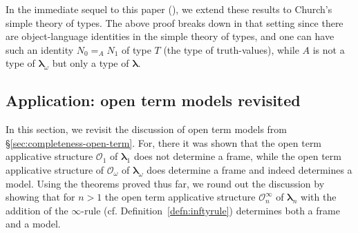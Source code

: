\documentclass{lmcs} %
\newcommand{\mlt}[1]{\boldsymbol\lambda_{#1}}
\newcommand{\mltpure}{\mlt{\omega}}
\newcommand{\lt}{\boldsymbol\lambda}
\begin{document}
In the immediate sequel to this paper (\cite{Walsh2024-mltII}), we extend these results to Church's simple theory of types. The above proof breaks down in that setting since there are object-language identities in the simple theory of types, and one can have such an identity $N_0=_A N_1$ of type $T$ (the type of truth-values), while $A$ is not a type of $\mltpure$ but only a type of $\lt$.




\subsection{Application: open term models revisited}\label{sec:opentermmodelsredeux}

In this section, we revisit the discussion of open term models from \S\ref{sec:completeness-open-term}. For, there it was shown that the open term applicative structure $\mathcal{O}_1$ of $\mlt{1}$ does not determine a frame, while the open term applicative structure of $\mathcal{O}_{\omega}$ of $\mltpure$ does determine a frame and indeed determines a model. Using the theorems proved thus far, we round out the discussion by showing that for $n>1$ the open term applicative structure $\mathcal{O}_n^{\infty}$ of $\mlt{n}$ with the addition of the $\infty$-rule (cf. Definition~\ref{defn:inftyrule}) determines both a frame and a model.
\end{document}

